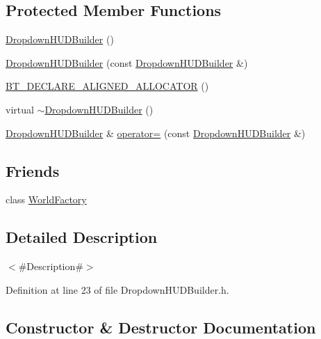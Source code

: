 \subsection*{Protected Member Functions}
\begin{DoxyCompactItemize}
\item 
\mbox{\hyperlink{classnjli_1_1_dropdown_h_u_d_builder_a3cc32e8c174921be2da4053a9cd6dd80}{Dropdown\+H\+U\+D\+Builder}} ()
\item 
\mbox{\hyperlink{classnjli_1_1_dropdown_h_u_d_builder_aa0a70e84ba73cffac3ac290c0eb07c64}{Dropdown\+H\+U\+D\+Builder}} (const \mbox{\hyperlink{classnjli_1_1_dropdown_h_u_d_builder}{Dropdown\+H\+U\+D\+Builder}} \&)
\item 
\mbox{\hyperlink{classnjli_1_1_dropdown_h_u_d_builder_a6daf1f10d29a42c58ff7cb22479b3771}{B\+T\+\_\+\+D\+E\+C\+L\+A\+R\+E\+\_\+\+A\+L\+I\+G\+N\+E\+D\+\_\+\+A\+L\+L\+O\+C\+A\+T\+OR}} ()
\item 
virtual \mbox{\hyperlink{classnjli_1_1_dropdown_h_u_d_builder_aae27fe4bd2b27cb82adf197b985ccfdc}{$\sim$\+Dropdown\+H\+U\+D\+Builder}} ()
\item 
\mbox{\hyperlink{classnjli_1_1_dropdown_h_u_d_builder}{Dropdown\+H\+U\+D\+Builder}} \& \mbox{\hyperlink{classnjli_1_1_dropdown_h_u_d_builder_ab694e3c60c07c5cf4559099fdf14c4cb}{operator=}} (const \mbox{\hyperlink{classnjli_1_1_dropdown_h_u_d_builder}{Dropdown\+H\+U\+D\+Builder}} \&)
\end{DoxyCompactItemize}
\subsection*{Friends}
\begin{DoxyCompactItemize}
\item 
class \mbox{\hyperlink{classnjli_1_1_dropdown_h_u_d_builder_acb96ebb09abe8f2a37a915a842babfac}{World\+Factory}}
\end{DoxyCompactItemize}


\subsection{Detailed Description}
$<$\#\+Description\#$>$ 

Definition at line 23 of file Dropdown\+H\+U\+D\+Builder.\+h.



\subsection{Constructor \& Destructor Documentation}
\mbox{\label{classnjli_1_1_dropdown_h_u_d_builder_a3cc32e8c174921be2da4053a9cd6dd80}} 

